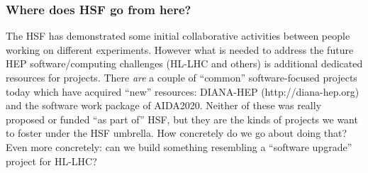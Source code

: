 \begin{frame}
\frametitle{Where does HSF go from here?}

  The HSF has demonstrated some initial collaborative activities between people working on different experiments. However what is needed to address the future HEP software/computing challenges (HL-LHC and others) is additional dedicated resources for projects.
\vskip 0.15in
  There {\em are} a couple of ``common'' software-focused projects today which have acquired ``new'' resources: DIANA-HEP (http://diana-hep.org) and the software work package of AIDA2020. Neither of these was really proposed or funded ``as part of'' HSF, but they are the kinds of projects we want to foster under the HSF umbrella. How concretely do we go about doing that?
\vskip 0.15in
Even more concretely: can we build something resembling a ``software upgrade'' project for HL-LHC?

\end{frame}


